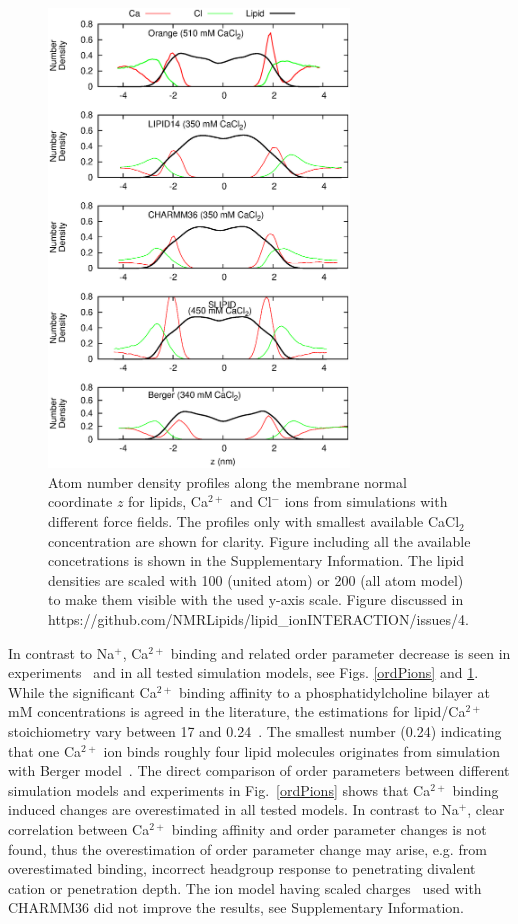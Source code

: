 \documentclass[pre,aps,floatfix,authordate1-4,twocolumn]{revtex4-1}
\begin{document}
\begin{figure}[]
  \centering
  \includegraphics[width=8cm]{../Fig/CAdensitiesCLEAR.eps}
  \caption{\label{CAdensitiesCLEAR}
    Atom number density profiles along the membrane normal coordinate $z$ for lipids, Ca$^{2+}$ and Cl$^-$ ions from simulations with different force fields.
    The profiles only with smallest available CaCl$_2$ concentration are shown for clarity.
    Figure including all the available concetrations is shown in the Supplementary Information.
    The lipid densities are scaled with 100 (united atom) or 200 (all atom model) to make them visible with the used y-axis scale.
    Figure discussed in https://github.com/NMRLipids/lipid\_ionINTERACTION/issues/4.
  }
\end{figure}
In contrast to Na$^+$, Ca$^{2+}$ binding and related order parameter decrease is seen in experiments~\cite{akutsu81,altenbach84,cevc90,tocanne90} 
and in all tested simulation models, see Figs. \ref{ordPions} and \ref{CAdensitiesCLEAR}.
While the significant Ca$^{2+}$ binding affinity to a phosphatidylcholine bilayer at mM concentrations  
is agreed in the literature, the estimations for lipid/Ca$^{2+}$ stoichiometry vary between 17 
and 0.24~\cite{tatulian87,altenbach84,bockmann04}. The smallest number (0.24) indicating that one 
Ca$^{2+}$ ion binds roughly four lipid molecules originates from simulation with Berger model~\cite{bockmann04}.
The direct comparison of order parameters between different simulation models and experiments in Fig.~\ref{ordPions}
shows that Ca$^{2+}$ binding induced changes are overestimated in all tested models.
In contrast to Na$^+$, clear correlation between Ca$^{2+}$ binding affinity and order parameter changes is not found, 
thus the overestimation of order parameter change may arise, e.g. from overestimated binding, 
incorrect headgroup response to penetrating divalent cation or penetration depth. 
The ion model having scaled charges~\cite{kohagen14} used with CHARMM36 did not improve the results, see Supplementary Information.
\end{document}
